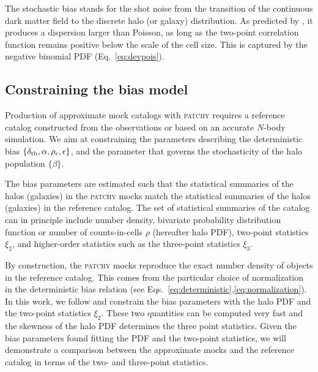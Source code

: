 \documentclass[english,usenatbib]{mn2e}
\begin{document}
The stochastic bias stands for the shot noise from the transition of the continuous dark matter field to the discrete halo (or galaxy) distribution. As predicted by \citet{Peebles1980}, it produces a dispersion larger than Poisson, as long as the two-point correlation function remains positive below the scale of the cell size. This is captured by the negative binomial PDF (Eq.~\ref{eq:devpois}).

\subsection{Constraining the bias model}
\label{sec:mcmc}

Production of approximate mock catalogs with \textsc{patchy} requires a reference catalog constructed from the observations or based on an accurate $N$-body simulation. 
We aim at constraining the parameters describing the deterministic bias $\{\delta_{\rm th},\alpha, \rho_{\epsilon},\epsilon\}$, and the parameter that governs the stochasticity of the halo population $\{\beta\}$.

The bias parameters are estimated such that the statistical summaries of the halos (galaxies) in the \textsc{patchy} mocks match the statistical summaries of the halos (galaxies) in the reference catalog. The set of statistical summaries of the catalog can in principle include number density, bivariate probability distribution function or number of counts-in-cells $\rho$ (hereafter halo PDF), two-point statistics $\xi_{2}$, and higher-order statistics such as the three-point statistics $\xi_{3}$. 

By construction, the \textsc{patchy} mocks reproduce the exact number density of objects in the reference catalog. This comes from the particular choice of normalization in the deterministic bias relation (see Eqs.~\ref{eq:deterministic},\ref{eq:normalization}). In this work, we follow \citet{kitaura2015} and constrain the bias parameters with the halo PDF and the two-point statistics $\xi_{2}$. These two quantities can be computed very fast and the skewness of the halo PDF determines the three point statistics. Given the bias parameters found fitting the PDF and the two-point statistics, we will demonstrate a comparison between the approximate mocks and the reference catalog in terms of the two- and three-point statistics. 
\end{document}
